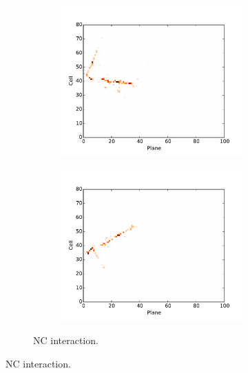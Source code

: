 \begin{figure}[t]
\begin{subfigure}[c]{\textwidth}
\centering
\begin{subfigure}[c]{0.47\textwidth}
\includegraphics[width=\textwidth]{figures/cnn/view_truetype13_caltype6_event144_x.pdf}
\vspace{-20pt}
\caption*{\xview}
\end{subfigure}
\begin{subfigure}[c]{0.47\textwidth}
\includegraphics[width=\textwidth]{figures/cnn/view_truetype13_caltype6_event144_y.pdf}
\vspace{-20pt}
\caption*{\yview}
\end{subfigure}
\vspace{-10pt}
\caption{NC interaction.}
\label{pixnc}
\end{subfigure}



\end{figure}
